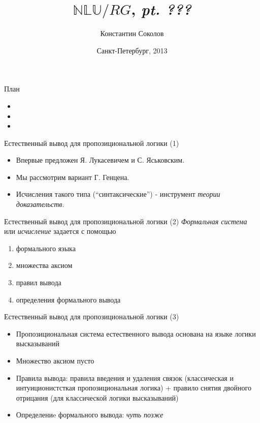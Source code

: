 \documentclass{beamer}
\begin{document}
\title{\huge{$\mathbb{NLU}/RG$, \textit{pt. ???}}}
\author{Константин Соколов}
\date{Санкт-Петербург, 2013} 
\begin{frame}
    \thispagestyle{empty}
    \titlepage
\end{frame}

\begin{frame}{План}
    \setcounter{framenumber}{1}
    \begin{itemize}
        \item 
        \item 
        \item 
    \end{itemize}
\end{frame}


\begin{frame}{Естественный вывод для пропозициональной логики (1)}
\begin{itemize}
  \item Впервые предложен Я. Лукасевичем и С. Яськовским.
  \item Мы рассмотрим вариант Г. Генцена.
  \item Исчисления такого типа (``синтаксические'') - инструмент \textit{теории доказательств}.
\end{itemize}
\end{frame}

\begin{frame}{Естественный вывод для пропозициональной логики (2)}
\textit{Формальная система} или \textit{исчисление} задается с помощью
\begin{enumerate}
  \item формального языка
  \item множества аксиом
  \item правил вывода
  \item определения формального вывода
\end{enumerate}
\end{frame}

\begin{frame}{Естественный вывод для пропозициональной логики (3)}
\begin{itemize}
  \item Пропозициональная система естественного вывода основана на языке логики высказываний
  \item Множество аксиом пусто
  \item Правила вывода: правила введения и удаления связок (классическая и интуиционистсткая пропозициональная логика) + правило снятия двойного отрицания (для классической логики высказываний)
  \item Определениe формального вывода: \textit{чуть позже}
\end{itemize}
\end{frame}
\end{document}
